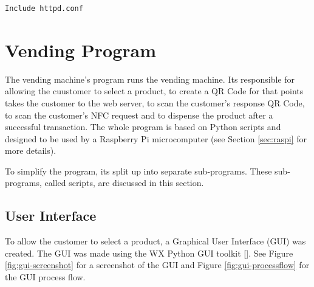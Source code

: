 \begin{verbatim}
Include httpd.conf
\end{verbatim}

\section{Vending Program}

The vending machine's program runs the vending machine. Its responsible for
allowing the cuustomer to select a product, to create a QR Code for that points
takes the customer to the web server, to scan the customer's response QR Code,
to scan the customer's NFC request and to dispense the product after a
successful transaction. The whole program is based on Python scripts and
designed to be used by a Raspberry Pi microcomputer (see Section
\ref{sec:raspi} for more details).

To simplify the program, its split up into separate sub-programs. These
sub-programs, called scripts, are discussed in this section.

\subsection{User Interface}

To allow the customer to select a product, a Graphical User Interface (GUI) was
created. The GUI was made using the WX Python GUI toolkit
[\cite{website:wx-python}].
See Figure \ref{fig:gui-screenshot} for a screenshot of the GUI and Figure
\ref{fig:gui-processflow} for the GUI process flow.

